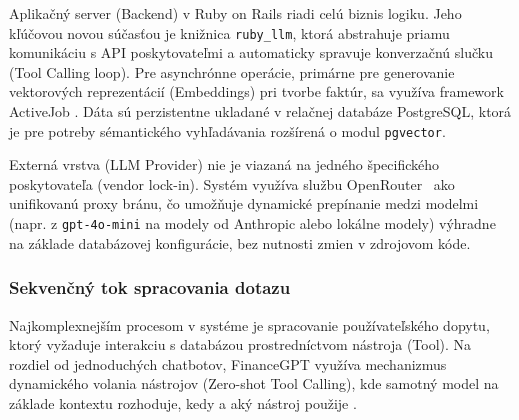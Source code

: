 Aplikačný server (Backend) v Ruby on Rails riadi celú biznis logiku. Jeho kľúčovou
novou súčasťou je knižnica \texttt{ruby\_llm}, ktorá abstrahuje priamu komunikáciu
s API poskytovateľmi a automaticky spravuje konverzačnú slučku (Tool Calling
loop). Pre asynchrónne operácie, primárne pre generovanie vektorových reprezentácií
(Embeddings) pri tvorbe faktúr, sa využíva framework ActiveJob \cite{zhao2023}. Dáta
sú perzistentne ukladané v relačnej databáze PostgreSQL, ktorá je pre potreby
sémantického vyhľadávania rozšírená o modul \texttt{pgvector}.

Externá vrstva (LLM Provider) nie je viazaná na jedného špecifického poskytovateľa
(vendor lock-in). Systém využíva službu OpenRouter~\cite{openrouter2024} ako
unifikovanú proxy bránu, čo %
umožňuje dynamické prepínanie medzi modelmi (napr. z \texttt{gpt-4o-mini} na modely
od Anthropic alebo lokálne modely) výhradne na základe databázovej konfigurácie, bez
nutnosti zmien v zdrojovom kóde.

\subsubsection{Sekvenčný tok spracovania dotazu}

Najkomplexnejším procesom v systéme je spracovanie používateľského dopytu, ktorý vyžaduje
interakciu s databázou prostredníctvom nástroja (Tool). Na rozdiel od
jednoduchých chatbotov, FinanceGPT využíva mechanizmus dynamického volania nástrojov
(Zero-shot Tool Calling), kde samotný model na základe kontextu rozhoduje, kedy a
aký nástroj použije \cite{atkinson2025}.

